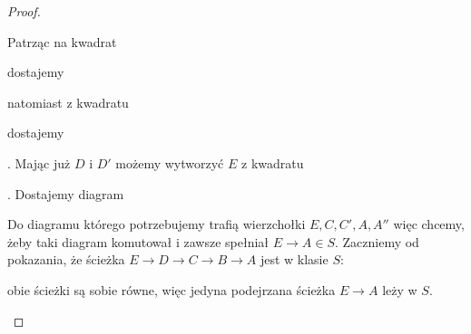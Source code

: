 \begin{proof}
\begin{enumerate}
\begin{enumerate}
      Patrząc na kwadrat  dostajemy  natomiast z kwadratu  dostajemy . Mając już $D$ i $D'$ możemy wytworzyć $E$ z kwadratu . Dostajemy diagram
      \begin{center}\end{center}
      Do diagramu którego potrzebujemy trafią wierzchołki $E, C, C', A, A''$ więc chcemy, żeby taki diagram komutował i zawsze spełniał $E\to A\in S$. Zaczniemy od pokazania, że ścieżka $E\to D\to C\to B\to A$ jest w klasie $S$:
      \begin{center}\end{center}
      obie ścieżki są sobie równe, więc jedyna podejrzana ścieżka $E\to A$ leży w $S$.


\end{enumerate}
\end{enumerate}
\end{proof}
